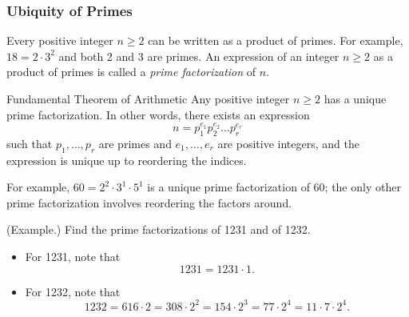 \documentclass[letterpaper]{article}
\begin{document}
\subsubsection{Ubiquity of Primes}
Every positive integer $n \geq 2$ can be written as a product of primes. For example, $18 = 2 \cdot 3^2$ and both 2 and 3 are primes. An expression of an integer $n \geq 2$ as a product of primes is called a \emph{prime factorization} of $n$.

\begin{theorem}{Fundamental Theorem of Arithmetic}{}
    Any positive integer $n \geq 2$ has a unique prime factorization. In other words, there exists an expression \[n = p_1^{e_1} p_2^{e_2} \hdots p_r^{e_r}\] such that $p_1, \hdots, p_r$ are primes and $e_1, \hdots, e_r$ are positive integers, and the expression is unique up to reordering the indices. 
\end{theorem}
For example, $60 = 2^2 \cdot 3^1 \cdot 5^1$ is a unique prime factorization of 60; the only other prime factorization involves reordering the factors around. 

\begin{mdframed}
    (Example.) Find the prime factorizations of 1231 and of 1232.

    \begin{mdframed}
        \begin{itemize}
            \item For 1231, note that 
            \[1231 = 1231 \cdot 1.\]

            \item For 1232, note that 
            \[1232 = 616 \cdot 2 = 308 \cdot 2^2 = 154 \cdot 2^3 = 77 \cdot 2^4 = 11 \cdot 7 \cdot 2^4.\]
        \end{itemize}
    \end{mdframed}
\end{mdframed}
\end{document}
